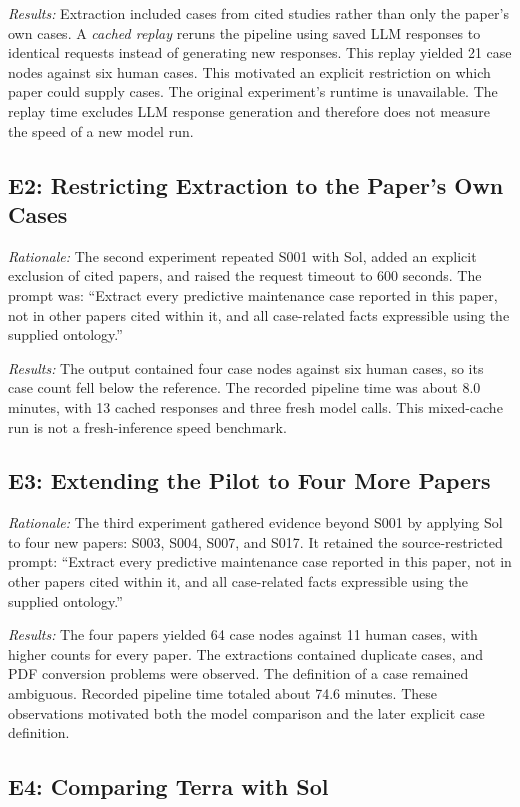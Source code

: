 \documentclass[journal]{IEEEtran}
\newcommand{\ownCasesPrompt}{Extract every predictive maintenance case reported in this paper, not in other papers cited within it, and all case-related facts expressible using the supplied ontology.}
\begin{document}
\emph{Results:} Extraction included cases from cited studies rather than only the paper's own cases. A \emph{cached replay} reruns the pipeline using saved LLM responses to identical requests instead of generating new responses. This replay yielded 21 case nodes against six human cases. This motivated an explicit restriction on which paper could supply cases. The original experiment's runtime is unavailable. The replay time excludes LLM response generation and therefore does not measure the speed of a new model run.

\subsection{E2: Restricting Extraction to the Paper's Own Cases}
\label{exp:own-cases}

\emph{Rationale:} The second experiment repeated S001 with Sol, added an explicit exclusion of cited papers, and raised the request timeout to 600 seconds. The prompt was: ``\ownCasesPrompt''

\emph{Results:} The output contained four case nodes against six human cases, so its case count fell below the reference. The recorded pipeline time was about 8.0 minutes, with 13 cached responses and three fresh model calls. This mixed-cache run is not a fresh-inference speed benchmark.

\subsection{E3: Extending the Pilot to Four More Papers}
\label{exp:four-more}

\emph{Rationale:} The third experiment gathered evidence beyond S001 by applying Sol to four new papers: S003, S004, S007, and S017. It retained the source-restricted prompt: ``\ownCasesPrompt''

\emph{Results:} The four papers yielded 64 case nodes against 11 human cases, with higher counts for every paper. The extractions contained duplicate cases, and PDF conversion problems were observed. The definition of a case remained ambiguous. Recorded pipeline time totaled about 74.6 minutes. These observations motivated both the model comparison and the later explicit case definition.

\subsection{E4: Comparing Terra with Sol}
\label{exp:terra}
\end{document}

